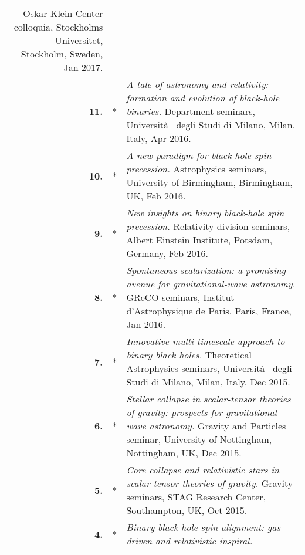 {\begin{longtable}{rp{0.3cm}p{15.8cm}}
\newline{}
Oskar Klein Center colloquia, Stockholms Universitet, Stockholm, Sweden, Jan 2017.
\vspace{0.05cm}\\
%
\textbf{11.} & * & \textit{A tale of astronomy and relativity: formation and evolution of black-hole binaries.}
\newline{}
Department seminars, Universit\`{a}  degli Studi di Milano, Milan, Italy, Apr 2016.
\vspace{0.05cm}\\
%
\textbf{10.} & * & \textit{A new paradigm for black-hole spin precession.}
\newline{}
Astrophysics seminars, University of Birmingham, Birmingham, UK, Feb 2016.
\vspace{0.05cm}\\
%
\textbf{9.} & * & \textit{New insights on binary black-hole spin precession.}
\newline{}
Relativity division seminars, Albert Einstein Institute, Potsdam, Germany, Feb 2016.
\vspace{0.05cm}\\
%
\textbf{8.} & * & \textit{Spontaneous scalarization: a promising avenue for gravitational-wave astronomy.}
\newline{}
GReCO seminars, Institut d'Astrophysique de Paris, Paris, France, Jan 2016.
\vspace{0.05cm}\\
%
\textbf{7.} & * & \textit{Innovative multi-timescale approach to binary black holes.}
\newline{}
Theoretical Astrophysics seminars, Universit\`{a}  degli Studi di Milano, Milan, Italy, Dec 2015.
\vspace{0.05cm}\\
%
\textbf{6.} & * & \textit{Stellar collapse in scalar-tensor theories of gravity: prospects for gravitational-wave astronomy.}
\newline{}
Gravity and Particles seminar, University of Nottingham, Nottingham, UK, Dec 2015.
\vspace{0.05cm}\\
%
\textbf{5.} & * & \textit{Core collapse and relativistic stars in scalar-tensor theories of gravity.}
\newline{}
Gravity seminars, STAG Research Center, Southampton, UK, Oct 2015.
\vspace{0.05cm}\\
%
\textbf{4.} & * & \textit{Binary black-hole spin alignment: gas-driven and relativistic inspiral.}

\end{longtable}}
